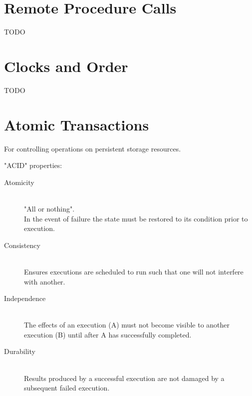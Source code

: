\documentclass[a4paper]{article}
\begin{document}
\section{Remote Procedure Calls}

TODO

\section{Clocks and Order}

TODO

\section{Atomic Transactions}

For controlling operations on persistent storage resources.

"ACID" properties:

\begin{description}
  \item[Atomicity] \hfill \\
    "All or nothing". \\
    In the event of failure the state must be restored to its condition prior to
    execution.
  \item[Consistency] \hfill \\
    Ensures executions are scheduled to run such that one will not interfere
    with another.
  \item[Independence] \hfill \\
    The effects of an execution (A) must not become visible to another execution
    (B) until after A has successfully completed.
  \item[Durability] \hfill \\
    Results produced by a successful execution are not damaged by a subsequent
    failed execution.
\end{description}
\end{document}

